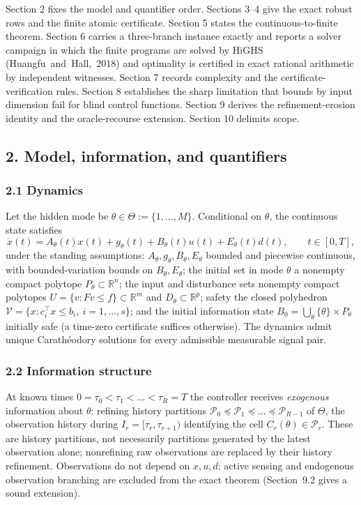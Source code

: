 \documentclass[10pt,twocolumn]{article}
\theoremstyle{definition}
\begin{document}
Section 2 fixes the model and quantifier order. Sections 3--4 give the exact
robust rows and the finite atomic certificate. Section 5 states the
continuous-to-finite theorem. Section 6 carries a three-branch instance
exactly and reports a solver campaign in which the finite programs are solved
by HiGHS \mbox{(Huangfu and Hall, 2018)} and optimality is certified in exact
rational arithmetic by independent witnesses. Section 7 records complexity and
the certificate-verification rules. Section 8 establishes the sharp limitation
that bounds by input dimension fail for blind control functions. Section 9
derives the refinement-erosion identity and the oracle-recourse extension.
Section 10 delimits scope.

\subsection{2. Model, information, and quantifiers}\label{model}

\subsubsection{2.1 Dynamics}\label{dynamics}

Let the hidden mode be
\(\theta \in \Theta := \{1,\dots,M\}\). Conditional on \(\theta\), the
continuous state satisfies
\[
\dot x(t) = A_\theta(t)x(t) + g_\theta(t) + B_\theta(t)u(t) + E_\theta(t)d(t),
\qquad t \in [0,T],
\]
under the standing assumptions: \(A_\theta, g_\theta, B_\theta, E_\theta\)
bounded and piecewise continuous, with bounded-variation bounds on
\(B_\theta, E_\theta\); the initial set in mode \(\theta\) a nonempty compact
polytope \(P_\theta \subset \mathbb{R}^n\); the input and disturbance sets
nonempty compact polytopes \(U = \{v : Fv \le f\} \subset \mathbb{R}^m\) and
\(D_\theta \subset \mathbb{R}^p\); safety the closed polyhedron
\(\mathcal{V} = \{x : c_i^\top x \le b_i,\ i = 1,\dots,s\}\); and the initial
information state
\(B_0 = \bigcup_{\theta} \{\theta\} \times P_\theta\) initially safe (a
time-zero certificate suffices otherwise). The dynamics admit unique
Carath\'eodory solutions for every admissible measurable signal pair.

\subsubsection{2.2 Information structure}\label{information}

At known times \(0 = \tau_0 < \tau_1 < \dots < \tau_R = T\) the controller
receives \emph{exogenous} information about \(\theta\): refining history
partitions
\(\mathcal{P}_0 \preceq \mathcal{P}_1 \preceq \dots \preceq \mathcal{P}_{R-1}\)
of \(\Theta\), the observation history during
\(I_r = [\tau_r, \tau_{r+1})\) identifying the cell \(C_r(\theta) \in
\mathcal{P}_r\). These are history partitions, not necessarily partitions
generated by the latest observation alone; nonrefining raw observations are
replaced by their history refinement. Observations do not depend on
\(x, u, d\): active sensing and endogenous observation branching are excluded
from the exact theorem (Section~9.2 gives a sound extension).
\end{document}

